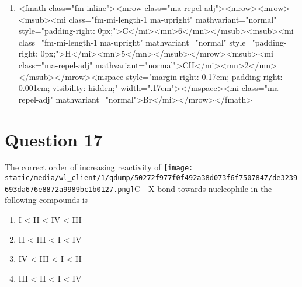 \documentclass{article}
\begin{document}
\begin{enumerate}[label=(\alph*)]
\item  <fmath class="fm-inline"><mrow class="ma-repel-adj"><mrow><mrow><msub><mi class="fm-mi-length-1 ma-upright" mathvariant="normal" style="padding-right: 0px;">C</mi><mn>6</mn></msub><msub><mi class="fm-mi-length-1 ma-upright" mathvariant="normal" style="padding-right: 0px;">H</mi><mn>5</mn></msub></mrow><msub><mi class="ma-repel-adj" mathvariant="normal">CH</mi><mn>2</mn></msub></mrow><mspace style="margin-right: 0.17em; padding-right: 0.001em; visibility: hidden;" width=".17em">‌</mspace><mi class="ma-repel-adj" mathvariant="normal">Br</mi></mrow></fmath>
\end{enumerate}
\newpage
\section*{Question 17}
The correct order of increasing reactivity of \texttt{[image: static/media/wl\_client/1/qdump/50272f977f0f492a38d073f6f7507847/de3239693da676e8872a9989bc1b0127.png]}C—X bond towards nucleophile in the following compounds is 
\begin{enumerate}[label=(\alph*)]
\item I < II < IV < III
\item II < III < I < IV
\item IV < III < I < II
\item III < II < I < IV
\end{enumerate}
\newpage
\end{document}
